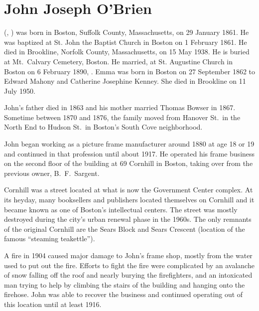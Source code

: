 \section{John Joseph O'Brien}

 (, ) was born in Boston, Suffolk County, Massachusetts, on 29 January 1861.\cite{John3OBrienBirth} He was baptized at St. John the Baptist Church in Boston on 1 February 1861.\cite{John3OBrienBaptism} He died in Brookline, Norfolk County, Massachusetts, on 15 May 1938.\cite{John3OBrienDeath} He is buried at Mt.\ Calvary Cemetery, Boston.\cite{John3OBrienBurial} He married, at St. Augustine Church in Boston on 6 February 1890, .\cite{John3OBrienMarriage,John3OBrienMarriage2} Emma was born in Boston on 27 September 1862 to Edward Mahony and Catherine Josephine Kenney.\cite{EmmaMahonyBaptism} She died in Brookline on 11 July 1950.\cite{EmmaMahonyDeath}

John's father died in 1863\cite{John2OBrienDeath} and his mother married Thomas Bowser in 1867.\cite{MaryMahoneyBowserMarriage} Sometime between 1870 and 1876, the family moved from Hanover St.\ in the North End to Hudson St.\ in Boston's South Cove neighborhood.\cite{ThomasBowser1870,ThomasBowser1876}

John began working as a picture frame manufacturer around 1880\cite{John3OBrien1880} at age 18 or 19 and continued in that profession until about 1917.\cite{John3OBrien1916} He operated his frame business on the second floor of the building at 69 Cornhill in Boston,\cite{John3OBrien1916,FrameShopFire} taking over from the previous owner, B.\ F.\ Sargent.\cite{PictureFrameLabel}

Cornhill was a street located at what is now the Government Center complex. At its heyday, many booksellers and publishers located themselves on Cornhill and it became known as one of Boston's intellectual centers.\cite{Cornhill} The street was mostly destroyed during the city's urban renewal phase in the 1960s. The only remnants of the original Cornhill are the Sears Block and Sears Crescent (location of the famous ``steaming teakettle'').\cite{Cornhill} 

A fire in 1904 caused major damage to John's frame shop, mostly from the water used to put out the fire. Efforts to fight the fire were complicated by an avalanche of snow falling off the roof and nearly burying the firefighters, and an intoxicated man trying to help by climbing the stairs of the building and hanging onto the firehose.\cite{FrameShopFire} John was able to recover the business and continued operating out of this location until at least 1916.\cite{John3OBrien1916}


